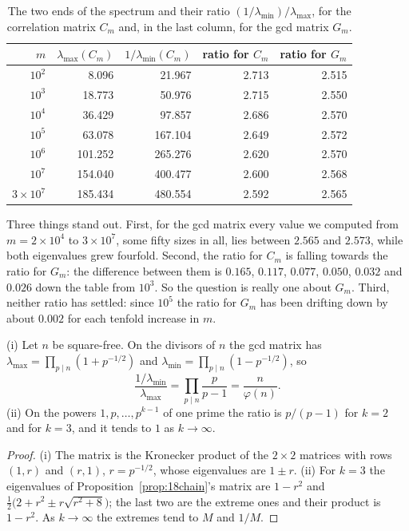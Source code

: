 \begin{table}[ht]
\centering
\caption{The two ends of the spectrum and their ratio $(1/\lambda_{\min})/\lambda_{\max}$, for the
correlation matrix $C_m$ and, in the last column, for the gcd matrix $G_m$.}\label{tab:18ratio}
\small
\begin{tabular}{rrrrr}
\hline
$m$ & $\lambda_{\max}(C_m)$ & $1/\lambda_{\min}(C_m)$ & ratio for $C_m$ & ratio for $G_m$\\
\hline
$10^{2}$ & 8.096 & 21.967 & 2.713 & 2.515\\
$10^{3}$ & 18.773 & 50.976 & 2.715 & 2.550\\
$10^{4}$ & 36.429 & 97.857 & 2.686 & 2.570\\
$10^{5}$ & 63.078 & 167.104 & 2.649 & 2.572\\
$10^{6}$ & 101.252 & 265.276 & 2.620 & 2.570\\
$10^{7}$ & 154.040 & 400.477 & 2.600 & 2.568\\
$3\times10^{7}$ & 185.434 & 480.554 & 2.592 & 2.565\\
\hline
\end{tabular}
\end{table}

Three things stand out. First, for the gcd matrix every value we computed from $m=2\times10^{4}$ to $3\times10^{7}$, some fifty
sizes in all, lies between $2.565$ and $2.573$, while both eigenvalues grew fourfold. Second, the ratio for $C_m$
is falling towards the ratio for $G_m$: the difference between them is $0.165$, $0.117$, $0.077$, $0.050$,
$0.032$ and $0.026$ down the table from $10^{3}$. So the question is really one about $G_m$. Third,
neither ratio has settled: since $10^{5}$ the ratio for $G_m$ has been drifting down by about $0.002$ for
each tenfold increase in $m$.

\begin{proposition}\label{prop:18exact}
(i) Let $n$ be square-free. On the divisors of $n$ the gcd matrix has
$\lambda_{\max}=\prod_{p\mid n}(1+p^{-1/2})$ and $\lambda_{\min}=\prod_{p\mid n}(1-p^{-1/2})$, so
\[
  \frac{1/\lambda_{\min}}{\lambda_{\max}}=\prod_{p\mid n}\frac{p}{p-1}=\frac{n}{\varphi(n)} .
\]
(ii) On the powers $1,p,\ldots,p^{k-1}$ of one prime the ratio is $p/(p-1)$ for $k=2$ and for $k=3$, and it
tends to $1$ as $k\to\infty$.
\end{proposition}

\begin{proof}
(i) The matrix is the Kronecker product of the $2\times2$ matrices with rows $(1,r)$ and $(r,1)$,
$r=p^{-1/2}$, whose eigenvalues are $1\pm r$. (ii) For $k=3$ the eigenvalues of
Proposition~\ref{prop:18chain}'s matrix are $1-r^{2}$ and $\tfrac12\bigl(2+r^{2}\pm r\sqrt{r^{2}+8}\bigr)$; the
last two are the extreme ones and their product is $1-r^{2}$. As $k\to\infty$ the extremes tend to $M$ and
$1/M$.
\end{proof}

